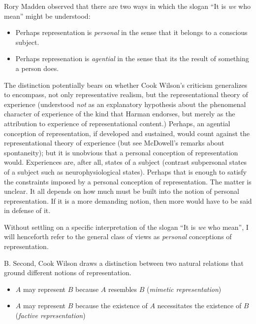 \documentclass[11pt]{article}
\begin{document}
\begin{discussion}
    Rory Madden observed that there are two ways in which the slogan ``It is \emph{we} who mean'' might be understood:
    \begin{itemize}
    	\item Perhaps representation is \emph{personal} in the sense that it belongs to a conscious subject.
    	\item Perhaps represenation is \emph{agential} in the sense that its the result of something a person does.
    \end{itemize}

    The distinction potentially bears on whether Cook Wilson's criticism generalizes to encompass, not only representative realism, but the representational theory of experience (understood \emph{not} as an explanatory hypothesis about the phenomenal character of experience of the kind that Harman endorses, but merely as the attribution to experience of representational content.) Perhaps, an agential conception of representation, if developed and sustained, would count against the representational theory of experience (but see McDowell's remarks about spontaneity); but it is unobvious that a personal conception of representation would. Experiences are, after all, states of a subject (contrast subpersonal states of a subject such as neurophysiological states). Perhaps that is enough to satisfy the constraints imposed by a personal conception of representation. The matter is unclear. It all depends on how much must be built into the notion of personal representation. If it is a more demanding notion, then more would have to be said in defense of it.
\end{discussion}

Without settling on a specific interpretation of the slogan ``It is \emph{we} who mean'', I will henceforth refer to the general class of views as \emph{personal} conceptions of representation.

B. Second, Cook Wilson draws a distinction between two natural relations that ground different notions of representation.
\begin{itemize}
	\item \( A \) may represent \( B \) because \( A \) resembles \( B \) (\emph{mimetic representation})
	\item \( A \) may represent \( B \) because the existence of \( A \) necessitates the existence of \( B \) (\emph{factive representation})
\end{itemize}
\end{document}

